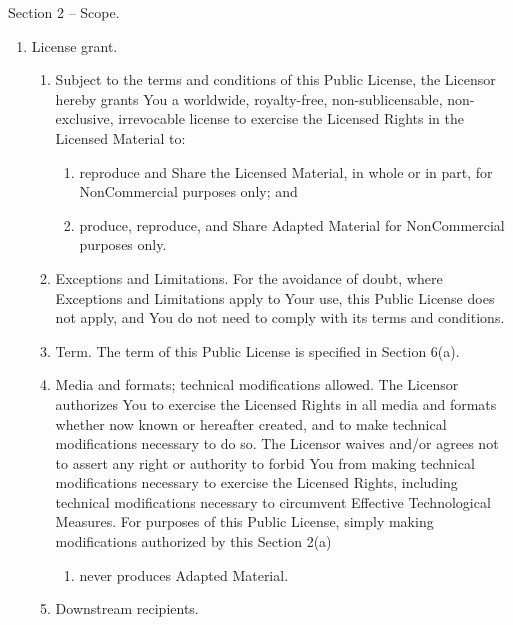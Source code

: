 \documentclass[
]{scrbook}
\providecommand{\tightlist}{%
  \setlength{\itemsep}{0pt}\setlength{\parskip}{0pt}}
\begin{document}
Section 2 -- Scope.

\begin{enumerate}
\def\labelenumi{\alph{enumi}.}
\item
  License grant.

  \begin{enumerate}
  \def\labelenumii{\arabic{enumii}.}
  \item
    Subject to the terms and conditions of this Public License, the
    Licensor hereby grants You a worldwide, royalty-free,
    non-sublicensable, non-exclusive, irrevocable license to exercise
    the Licensed Rights in the Licensed Material to:

    \begin{enumerate}
    \def\labelenumiii{\alph{enumiii}.}
    \item
      reproduce and Share the Licensed Material, in whole or in part,
      for NonCommercial purposes only; and
    \item
      produce, reproduce, and Share Adapted Material for NonCommercial
      purposes only.
    \end{enumerate}
  \item
    Exceptions and Limitations. For the avoidance of doubt, where
    Exceptions and Limitations apply to Your use, this Public License
    does not apply, and You do not need to comply with its terms and
    conditions.
  \item
    Term. The term of this Public License is specified in Section 6(a).
  \item
    Media and formats; technical modifications allowed. The Licensor
    authorizes You to exercise the Licensed Rights in all media and
    formats whether now known or hereafter created, and to make
    technical modifications necessary to do so. The Licensor waives
    and/or agrees not to assert any right or authority to forbid You
    from making technical modifications necessary to exercise the
    Licensed Rights, including technical modifications necessary to
    circumvent Effective Technological Measures. For purposes of this
    Public License, simply making modifications authorized by this
    Section 2(a)

    \begin{enumerate}
    \def\labelenumiii{(\arabic{enumiii})}
    \setcounter{enumiii}{3}
    \tightlist
    \item
      never produces Adapted Material.
    \end{enumerate}
  \item
    Downstream recipients.


\end{enumerate}
\end{enumerate}
\end{document}
